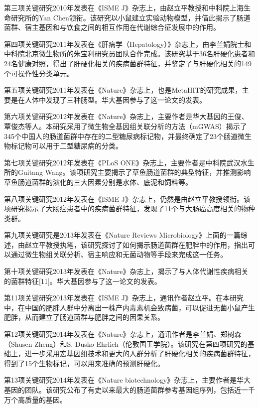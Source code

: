 \documentclass[]{ctexbook}
\begin{document}
第三项关键研究2010年发表在《ISME J》杂志上，由赵立平教授和中科院上海生命研究所的Yan Chen领衔。该研究以小鼠建立实验动物模型，并借此揭示了肠道菌群、宿主基因和与饮食之间的相互作用在代谢综合征发展中的作用。

第四项关键研究2011年发表在《肝病学（Hepatology）》杂志上，由李兰娟院士和中科院北京微生物所的朱宝利研究员团队合作完成。该研究基于36名肝硬化患者和24名健康对照，得出了肝硬化相关的疾病菌群特征，并鉴定了与肝硬化相关的149个可操作性分类单元。

第五项关键研究2011年发表在《Nature》杂志上，也是MetaHIT的研究成果，主要是在人体中发现了三种肠型。华大基因参与了这一论文的发表。

第六项关键研究2012年发表在《Nature》杂志上，主要作者是华大基因的王俊、覃俊杰等人。本研究采用了微生物全基因组关联分析的方法（mGWAS）揭示了345个中国人的肠道菌群中存在的二型糖尿病标记物，并最终确定了23个肠道微生物标记物可以用于二型糖尿病的分类。

第七项关键研究2012年发表在《PLoS ONE》杂志上，主要作者是中科院武汉水生所的Guitang Wang。该项研究主要揭示了草鱼肠道菌群的典型特征，并推测影响草鱼肠道菌群的演化的三大因素分别是水体、底泥和饲料等。

第八项关键研究2012年发表在《ISME J》杂志上，仍然是由赵立平教授领衔。该项研究揭示了大肠癌患者中的疾病菌群特征，发现了11个与大肠癌高度相关的物种类群。

第九项关键研究是2013年发表在《Nature Reviews Microbiology》上面的一篇综述，由赵立平教授执笔，该研究探讨了如何揭示肠道菌群在肥胖中的作用，指出可以通过微生物组关联分析、宿主响应和无菌动物等手段来完成这一任务。

第十项关键研究2013年发表在《Nature》杂志上，揭示了与人体代谢性疾病相关的菌群特征{[}11{]}。华大基因参与了这一论文的发表。

第11项关键研究2013年发表在《ISME J》杂志上，通讯作者赵立平。在本研究中，在中国的肥胖人群中分离出一株产内毒素机会致病菌，可以促进无菌小鼠产生肥胖，从而建立了肠道菌群与肥胖之间的因果关系。

第12项关键研究2014年发表在《Nature》杂志上，通讯作者是李兰娟、郑树森（Shusen Zheng）和S. Dusko Ehrlich（伦敦国王学院）。该研究在第四项研究的基础上，进一步采用宏基因组技术和更大的人群分析了肝硬化相关的疾病菌群特征，得到了15个生物标记，可以用来准确的预测肝硬化。

第13项关键研究2014年发表在《Nature biotechnology》杂志上，主要作者是华大基因的团队。该研究公布了有史以来最大的肠道菌群参考基因组序列，包括近一千万个高质量的基因。

\hypertarget{htmlwidget-78143d5ff39869a5c571}{}
\end{document}
